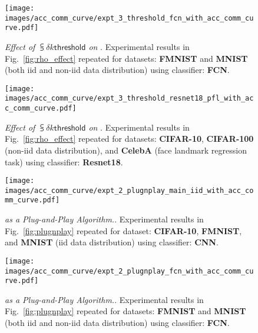 \begin{figure}[t]
  \centering
  \centerline{\texttt{[image: images/acc\_comm\_curve/expt\_3\_threshold\_fcn\_with\_acc\_comm\_curve.pdf]}}
  \caption{\small{\textit{Effect of $\subsup{\delta}{k}{\mathsf{threshold}}$ on {\algName}}. Experimental results in Fig.~\ref{fig:rho_effect} repeated for datasets: \textbf{FMNIST} and \textbf{MNIST} (both iid and non-iid data distribution) using classifier: \textbf{FCN}.}}
      \label{fig:rho_effect_fcn}
\end{figure}

\begin{figure}[t]
  \centering
    \centerline{\texttt{[image: images/acc\_comm\_curve/expt\_3\_threshold\_resnet18\_pfl\_with\_acc\_comm\_curve.pdf]}}
  \caption{\small{\textit{Effect of $\subsup{\delta}{k}{\mathsf{threshold}}$ on {\algName}}. Experimental results in Fig.~\ref{fig:rho_effect} repeated for datasets: \textbf{CIFAR-10}, \textbf{CIFAR-100} (non-iid data distribution), and \textbf{CelebA} (face landmark regression task) using classifier: \textbf{Resnet18}.}}
  \label{fig:rho_effect_resnet18}
\end{figure}


\begin{figure}[t]
  \centering
    \centerline{\texttt{[image: images/acc\_comm\_curve/expt\_2\_plugnplay\_main\_iid\_with\_acc\_comm\_curve.pdf]}}
  \caption{\small{\textit{{\algName} as a Plug-and-Play Algorithm.}. Experimental results in Fig.~\ref{fig:plugnplay} repeated for dataset: \textbf{CIFAR-10}, \textbf{FMNIST}, and \textbf{MNIST} (iid data distribution) using classifier: \textbf{CNN}.}}
  \label{fig:plugnplay_cnn}
\end{figure}

\begin{figure}[t]
  \centering
    \centerline{\texttt{[image: images/acc\_comm\_curve/expt\_2\_plugnplay\_fcn\_with\_acc\_comm\_curve.pdf]}}
    \caption{\small{\textit{{\algName} as a Plug-and-Play Algorithm.}. Experimental results in Fig.~\ref{fig:plugnplay} repeated for datasets: \textbf{FMNIST} and \textbf{MNIST} (both iid and non-iid data distribution) using classifier: \textbf{FCN}.}}
  \label{fig:plugnplay_fcn}
  \vspace{-4mm}
\end{figure}

